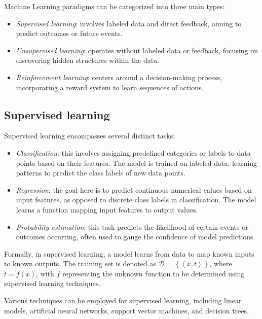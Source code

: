 Machine Learning paradigms can be categorized into three main types:
\begin{itemize}
    \item \textit{Supervised learning}: involves labeled data and direct feedback, aiming to predict outcomes or future events.
    \item \textit{Unsupervised learning}: operates without labeled data or feedback, focusing on discovering hidden structures within the data.
    \item \textit{Reinforcement learning}: centers around a decision-making process, incorporating a reward system to learn sequences of actions.
\end{itemize}

\subsection{Supervised learning}
Supervised learning encompasses several distinct tasks:
\begin{itemize}
    \item \textit{Classification}: this involves assigning predefined categories or labels to data points based on their features. 
        The model is trained on labeled data, learning patterns to predict the class labels of new data points.
    \item \textit{Regression}: the goal here is to predict continuous numerical values based on input features, as opposed to discrete class labels in classification. 
        The model learns a function mapping input features to output values.
    \item \textit{Probability estimation}: this task predicts the likelihood of certain events or outcomes occurring, often used to gauge the confidence of model predictions.
\end{itemize}
Formally, in supervised learning, a model learns from data to map known inputs to known outputs. 
The training set is denoted as $\mathcal{D}=\left\{\left\langle x,t \right\rangle\right\}$, where $t = f(x)$, with $f$ representing the unknown function to be determined using supervised learning techniques.

Various techniques can be employed for supervised learning, including linear models, artificial neural networks, support vector machines, and decision trees.

